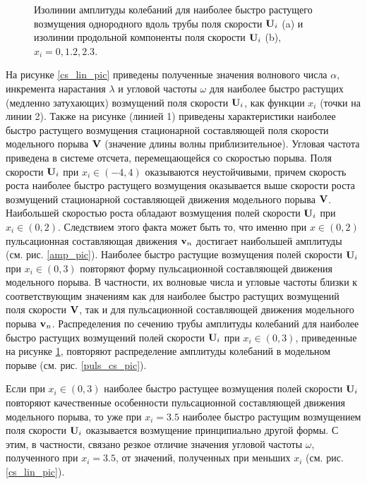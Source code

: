\begin{figure}
\caption{Изолинии амплитуды колебаний для наиболее быстро растущего возмущения однородного вдоль трубы поля скорости $\mathbf{U}_i$ (a) и изолинии продольной компоненты поля скорости $\mathbf{U}_i$ (b), $x_i = 0, 1.2, 2.3$.}
\label{cs_lin_map_pic}
\end{figure}

На рисунке \ref{cs_lin_pic} приведены полученные значения волнового числа $\alpha$, инкремента нарастания $\lambda$ и угловой частоты $\omega$ для наиболее быстро растущих (медленно затухающих) возмущений поля скорости $\mathbf{U}_i$, как функции $x_i$ (точки на линии 2). Также на рисунке (линией 1) приведены характеристики наиболее быстро растущего возмущения стационарной составляющей поля скорости модельного порыва $\mathbf{V}$ (значение длины волны приблизительное). Угловая частота приведена в системе отсчета, перемещающейся со скоростью порыва. Поля скорости $\mathbf{U}_i$ при $x_i \in (-4,4)$ оказываются неустойчивыми, причем скорость роста наиболее быстро растущего возмущения оказывается выше скорости роста возмущений стационарной составляющей движения модельного порыва $\mathbf{V}$. Наибольшей скоростью роста обладают возмущения полей скорости $\mathbf{U}_i$ при $x_i \in (0, 2)$. Следствием этого факта может быть то, что именно при $x \in (0,2)$ пульсационная составляющая движения $\mathbf{v}_n$ достигает наибольшей амплитуды (см. рис. \ref{amp_pic}). Наиболее быстро растущие  возмущения полей скорости $\mathbf{U}_i$ при $x_i \in (0,3)$ повторяют форму пульсационной составляющей движения модельного порыва. В частности, их волновые числа и угловые частоты близки к соответствующим значениям как для наиболее быстро растущих возмущений поля скорости $\mathbf{V}$, так и для пульсационной составляющей движения модельного порыва $\mathbf{v}_n$. Распределения по сечению трубы амплитуды колебаний для наиболее быстро растущих возмущений полей скорости $\mathbf{U}_i$ при $x_i \in (0,3)$, приведенные на рисунке \ref{cs_lin_map_pic}, повторяют распределение амплитуды колебаний в модельном порыве (см. рис. \ref{puls_cs_pic}).

Если при $x_i \in (0,3)$ наиболее быстро растущее возмущения полей скорости $\mathbf{U}_i$ повторяют качественные особенности пульсационной составляющей движения модельного порыва, то уже при $x_i = 3.5$ наиболее быстро растущим возмущением поля скорости $\mathbf{U}_i$ оказывается возмущение принципиально другой формы. С этим, в частности, связано резкое отличие значения угловой частоты $\omega$, полученного при $x_i = 3.5$, от значений, полученных при меньших $x_i$ (см. рис. \ref{cs_lin_pic}). 

